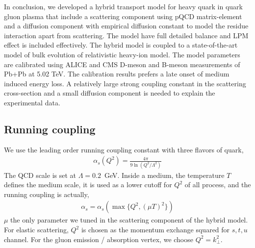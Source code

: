 \documentclass[aps, prc, reprint, amsmath, groupedaddress, nofootinbib]{revtex4-1}
\begin{document}
In conclusion, we developed a hybrid transport model for heavy quark in quark gluon plasma that include a scattering component using pQCD matrix-element and a diffusion component with empirical diffusion constant to model the residue interaction apart from scattering.
The model have full detailed balance and LPM effect is included effectively.
The hybrid model is coupled to a state-of-the-art model of bulk evolution of relativistic heavy-ion model.
The model parameters are calibrated using ALICE and CMS D-meson and B-meson measurements of Pb+Pb at 5.02 TeV.
The calibration results prefers a late onset of medium induced energy loss. 
A relatively large strong coupling constant in the scattering cross-section and a small diffusion component is needed to explain the experimental data.


\begin{appendices}
\section{Running coupling}
We use the leading order running coupling constant with three flavors of quark,
\begin{eqnarray}
\alpha_s(Q^2) = \frac{4\pi}{9 \ln\left(Q^2/\Lambda^2\right) }
\end{eqnarray}
The QCD scale is set at $\Lambda = 0.2$~GeV.
Inside a medium, the temperature $T$ defines the medium scale, it is used as a lower cutoff for $Q^2$ of all process, and the running coupling is actually,
\begin{eqnarray}
\alpha_s = \alpha_s(\max\{Q^2,(\mu T)^2\})
\end{eqnarray}
$\mu$ the only parameter we tuned in the scattering component of the hybrid model.
For elastic scattering, $Q^2$ is chosen as the momentum exchange squared for $s,t,u$ channel.
For the gluon emission / absorption vertex, we choose $Q^2 = k_\perp^2$.


\end{appendices}
\end{document}
